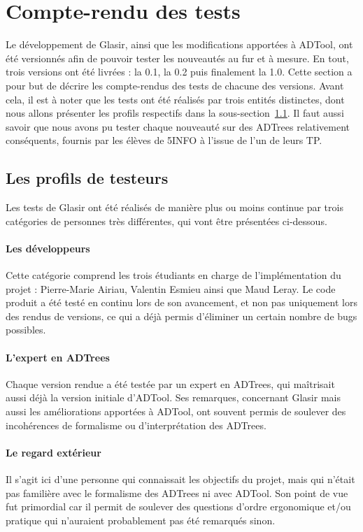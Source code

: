 \section{Compte-rendu des tests}
\label{sec:cr_tests}

Le développement de Glasir, ainsi que les modifications apportées à ADTool, ont été versionnés afin de pouvoir tester les nouveautés au fur et à mesure. En tout, trois versions ont été livrées : la 0.1, la 0.2 puis finalement la 1.0. Cette section a pour but de décrire les compte-rendus des tests de chacune des versions. Avant cela, il est à noter que les tests ont été réalisés par trois entités distinctes, dont nous allons présenter les profils respectifs dans la {\sc sous-section}~\ref{subsec:testeurs}. Il faut aussi savoir que nous avons pu tester chaque nouveauté sur des ADTrees relativement conséquents, fournis par les élèves de 5INFO à l'issue de l'un de leurs TP.

\subsection{Les profils de testeurs}
\label{subsec:testeurs}

Les tests de Glasir ont été réalisés de manière plus ou moins continue par trois catégories de personnes très différentes, qui vont être présentées ci-dessous.

\paragraph{Les développeurs} Cette catégorie comprend les trois étudiants en charge de l'implémentation du projet : Pierre-Marie {\sc Airiau}, Valentin {\sc Esmieu} ainsi que Maud {\sc Leray}. Le code produit a été testé en continu lors de son avancement, et non pas uniquement lors des rendus de versions, ce qui a déjà permis d'éliminer un certain nombre de \og bugs \fg{} possibles.

\paragraph{L'expert en ADTrees} Chaque version rendue a été testée par un expert en ADTrees, qui maîtrisait aussi déjà la version initiale d'ADTool. Ses remarques, concernant Glasir mais aussi les améliorations apportées à ADTool, ont souvent permis de soulever des incohérences de formalisme ou d'interprétation des ADTrees.

\paragraph{Le regard extérieur} Il s'agit ici d'une personne qui connaissait les objectifs du projet, mais qui n'était pas familière avec le formalisme des ADTrees ni avec ADTool. Son point de vue fut primordial car il permit de soulever des questions d'ordre ergonomique et/ou pratique qui n'auraient probablement pas été remarqués sinon.

